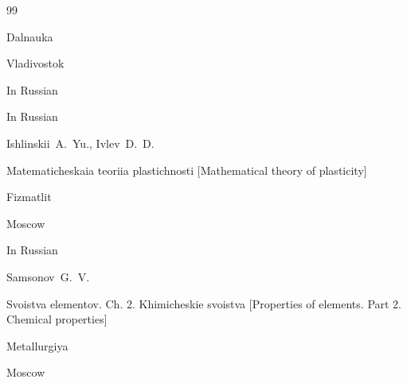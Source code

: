 \begin{thebibliography}{99}

\publ Dalnauka

\publaddr Vladivostok


\lang In Russian






\lang In Russian

\by Ishlinskii~A.~Yu., Ivlev~D.~D.

\book Matematicheskaia teoriia plastichnosti \rm [Mathematical theory of plasticity]


\publ Fizmatlit

\publaddr Moscow





\lang In Russian

\by  Samsonov~G.~V. 

\book Svoistva elementov. Ch. {\rm  2.} Khimicheskie svoistva  {\rm [Properties of elements. Part 2. Chemical properties]} 


\publ Metallurgiya

\publaddr Moscow




\end{thebibliography}





\newpage



%

